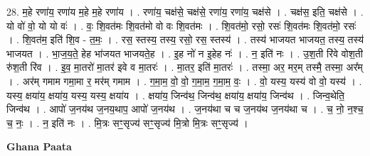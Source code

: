 \documentclass[17pt]{extarticle}
\begin{document}
28. म॒हे रणा॑य॒ रणा॑य म॒हे म॒हे रणा॑य । . रणा॑य॒ चक्ष॑से॒ चक्ष॑से॒ रणा॑य॒ रणा॑य॒ चक्ष॑से । . चक्ष॑स॒ इति॒ चक्ष॑से । . यो वो॑ वो॒ यो यो वः॑ । . वः॒ शि॒वत॑मः शि॒वत॑मो वो वः शि॒वत॑मः । . शि॒वत॑मो॒ रसो॒ रसः॑ शि॒वत॑मः शि॒वत॑मो॒ रसः॑ । . शि॒वत॑म॒ इति॑ शि॒व - त॒मः॒ । . रस॒ स्तस्य॒ तस्य॒ रसो॒ रस॒ स्तस्य॑ । . तस्य॑ भाजयत भाजयत॒ तस्य॒ तस्य॑ भाजयत । . भा॒ज॒य॒ते॒ हेह भा॑जयत भाजयते॒ह । . इ॒ह नो॑ न इ॒हेह नः॑ । . न॒ इति॑ नः । . उ॒श॒ती रि॑वे वोश॒ती रु॑श॒ती रि॑व । . इ॒व॒ मा॒तरो॑ मा॒तर॑ इवे व मा॒तरः॑ । . मा॒तर॒ इति॑ मा॒तरः॑ । . तस्मा॒ अर॒ मर॒म् तस्मै॒ तस्मा॒ अर᳚म् । . अर॑म् गमाम गमा॒मा र॒ मर॑म् गमाम । . ग॒मा॒म॒ वो॒ वो॒ ग॒मा॒म॒ ग॒मा॒म॒ वः॒ । . वो॒ यस्य॒ यस्य॑ वो वो॒ यस्य॑ । . यस्य॒ क्षया॑य॒ क्षया॑य॒ यस्य॒ यस्य॒ क्षया॑य । . क्षया॑य॒ जिन्व॑थ॒ जिन्व॑थ॒ क्षया॑य॒ क्षया॑य॒ जिन्व॑थ । . जिन्व॒थेति॒ जिन्व॑थ । . आपो॑ ज॒नय॑थ ज॒नय॒थाप॒ आपो॑ ज॒नय॑थ । . ज॒नय॑था च च ज॒नय॑थ ज॒नय॑था च । . च॒ नो॒ न॒श्च॒ च॒ नः॒ । . न॒ इति॑ नः । . मि॒त्रः सꣳ॒॒सृज्य॑ सꣳ॒॒सृज्य॑ मि॒त्रो मि॒त्रः सꣳ॒॒सृज्य॑ । \newline

\textbf{Ghana Paata } \newline
\end{document}
